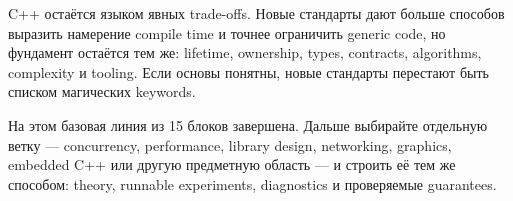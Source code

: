 \begin{importantbox}
C++ остаётся языком явных trade-offs. Новые стандарты дают больше способов
выразить намерение compile time и точнее ограничить generic code, но фундамент
остаётся тем же: lifetime, ownership, types, contracts, algorithms, complexity
и tooling. Если основы понятны, новые стандарты перестают быть списком
магических keywords.
\end{importantbox}

На этом базовая линия из 15 блоков завершена. Дальше выбирайте отдельную
ветку --- concurrency, performance, library design, networking, graphics,
embedded C++ или другую предметную область --- и строить её тем же способом:
theory, runnable experiments, diagnostics и проверяемые guarantees.
